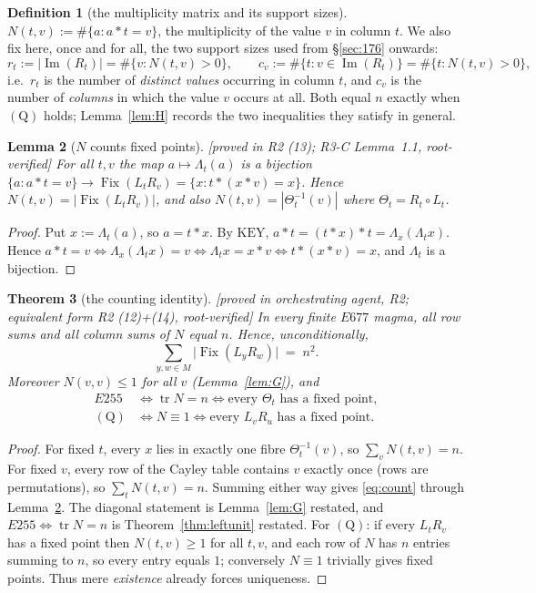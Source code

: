 \documentclass[11pt]{article}
\theoremstyle{plain}
\newtheorem{theorem}{Theorem}[section]
\newtheorem{lemma}[theorem]{Lemma}
\theoremstyle{definition}
\newtheorem{definition}[theorem]{Definition}
\theoremstyle{remark}
\numberwithin{equation}{section}
\newcommand{\op}{\mathbin{*}}
\newcommand{\Fix}{\operatorname{Fix}}
\newcommand{\Imm}{\operatorname{Im}}
\newcommand{\tr}{\operatorname{tr}}
\newcommand{\statusbox}[1]{{\small\sloppy\textsf{[#1]}}}
\newcommand{\PROVED}[1]{\statusbox{proved in #1, root-verified}}
\begin{document}
\begin{definition}[the multiplicity matrix and its support sizes]\label{def:N}
$N(t,v) := \#\{a : a\op t = v\}$, the multiplicity of the value $v$ in column $t$. We also fix
here, once and for all, the two support sizes used from \S\ref{sec:176} onwards:
\[
  r_t := |\Imm(R_t)| = \#\{v : N(t,v)>0\}, \qquad
  c_v := \#\{t : v\in\Imm(R_t)\} = \#\{t : N(t,v)>0\},
\]
i.e.\ $r_t$ is the number of \emph{distinct values} occurring in column $t$, and $c_v$ is the
number of \emph{columns} in which the value $v$ occurs at all. Both equal $n$ exactly when
$(\mathrm{Q})$ holds; Lemma~\ref{lem:H} records the two inequalities they satisfy in general.
\end{definition}

\begin{lemma}[$N$ counts fixed points]\label{lem:Nfix}
\PROVED{R2 (13); R3-C Lemma~1.1}
For all $t,v$ the map $a\mapsto \Lambda_t(a)$ is a bijection
$\{a: a\op t = v\} \to \Fix(L_t R_v) = \{x : t\op(x\op v) = x\}$. Hence
$N(t,v) = |\Fix(L_tR_v)|$, and also $N(t,v) = |\Theta_t^{-1}(v)|$ where
$\Theta_t = R_t\circ L_t$.
\end{lemma}

\begin{proof}
Put $x := \Lambda_t(a)$, so $a = t\op x$. By $\mathrm{KEY}$,
$a\op t = (t\op x)\op t = \Lambda_x(\Lambda_t x)$. Hence
$a\op t = v \iff \Lambda_x(\Lambda_t x) = v \iff \Lambda_t x = x\op v \iff t\op(x\op v) = x$,
and $\Lambda_t$ is a bijection.
\end{proof}

\begin{theorem}[the counting identity]\label{thm:count}
\PROVED{orchestrating agent, R2; equivalent form R2 (12)+(14)}
In every finite $E677$ magma, all row sums and all column sums of $N$ equal $n$. Hence,
unconditionally,
\begin{equation}\label{eq:count}
  \sum_{y,w\in M} \bigl|\Fix(L_y R_w)\bigr| \;=\; n^2 .
\end{equation}
Moreover $N(v,v)\le 1$ for all $v$ (Lemma~\ref{lem:G}), and
\[
  \begin{aligned}
    E255 &\iff \tr N = n \iff \text{every } \Theta_t \text{ has a fixed point},\\
    (\mathrm{Q}) &\iff N\equiv 1 \iff \text{every } L_vR_u \text{ has a fixed point}.
  \end{aligned}
\]
\end{theorem}

\begin{proof}
For fixed $t$, every $x$ lies in exactly one fibre $\Theta_t^{-1}(v)$, so
$\sum_v N(t,v) = n$. For fixed $v$, every row of the Cayley table contains $v$ exactly once
(rows are permutations), so $\sum_t N(t,v) = n$. Summing either way gives \eqref{eq:count}
through Lemma~\ref{lem:Nfix}. The diagonal statement is Lemma~\ref{lem:G} restated, and
$E255 \iff \tr N = n$ is Theorem~\ref{thm:leftunit} restated. For $(\mathrm{Q})$: if every
$L_tR_v$ has a fixed point then $N(t,v)\ge1$ for all $t,v$, and each row of $N$ has $n$
entries summing to $n$, so every entry equals $1$; conversely $N\equiv1$ trivially gives
fixed points. Thus mere \emph{existence} already forces uniqueness.
\end{proof}
\end{document}

